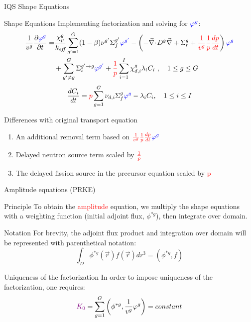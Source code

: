 \documentclass[8pt,xcolor=dvipnames]{beamer}
\renewcommand{\div}{\vec{\nabla}\! \cdot \!}
\newcommand{\grad}{\vec{\nabla}}
\newcommand{\ben}{\begin{enumerate}}
\newcommand{\een}{\end{enumerate}}
\newcommand{\keff}{\ensuremath{k_{\textit{eff}}}}
\newcommand{\tcr}[1]{\textcolor{red}{#1}}
\newcommand{\tcb}[1]{\textcolor{blue}{#1}}
\newcommand{\tcp}[1]{\textcolor{violet}{#1}}
\begin{document}
\begin{frame}{IQS Shape Equations}

\begin{block}{Shape Equations}
Implementing factorization and solving for $\tcb{\varphi^g}$:
\begin{align*}
\frac{1}{v^g} \frac{\partial \tcb{\varphi^g} }{\partial t} =& \frac{\chi_p^g}{\keff} \sum_{g'=1}^G (1-\beta) \nu^{g'} \Sigma_f^{g'} \tcb{\varphi^{g'}} -  \left( -\div D^g \grad  + \Sigma_r^g + \tcr{\frac{1}{v^g}}\tcr{\frac{1}{p}}\tcr{\frac{dp}{dt}}\right) \tcb{\varphi^g}  \nonumber \\
&  + \sum_{g'\neq g}^G\Sigma_s^{g'\to g} \tcb{\varphi^{g'}}  + \tcr{\frac{1}{p}}\sum_{i=1}^I\chi_{d,i}^g\lambda_i C_i \ , \quad 1 \le g \le G 
\end{align*}
\begin{equation*}
\frac{dC_i}{dt} = \tcr{p}\sum_{g=1}^G \nu_{d,i} \Sigma_f^g \tcb{\varphi^{g}} - \lambda_iC_i , \quad 1 \le i \le I
\end{equation*}
\end{block}

\begin{block}{Differences with original transport equation}
\ben
\item An additional removal term based on $\tcr{\frac{1}{v^g}\frac{1}{p}\frac{dp}{dt}} \tcb{\varphi^g}$
\item Delayed neutron source term scaled by $\tcr{\frac{1}{p}}$
\item The delayed fission source in the precursor equation scaled by \tcr{p}
\een
\end{block}

\end{frame}


\begin{frame}{Amplitude equations (PRKE)}

\begin{block}{Principle}
To obtain the \tcr{amplitude} equation, we multiply the shape equations with a weighting 
function (initial adjoint flux, $\phi^{*g}$), then integrate over domain.  
\end{block}

\begin{block}{Notation}
For brevity, the adjoint flux product and integration over domain will be represented with parenthetical notation:
\[
\int_D\phi^{*g}(\vec{r})f(\vec{r})dr^3=\left(\phi^{*g},f\right)
\]
\end{block}


\begin{block}{Uniqueness of the factorization}
In order to impose uniqueness of the factorization, one requires:
\[
\tcp{K_0} = \sum_{g=1}^G\left(\phi^{*g},\frac{1}{v^g}\varphi^g\right)= constant
\]
\end{block}


\end{frame}
\end{document}
